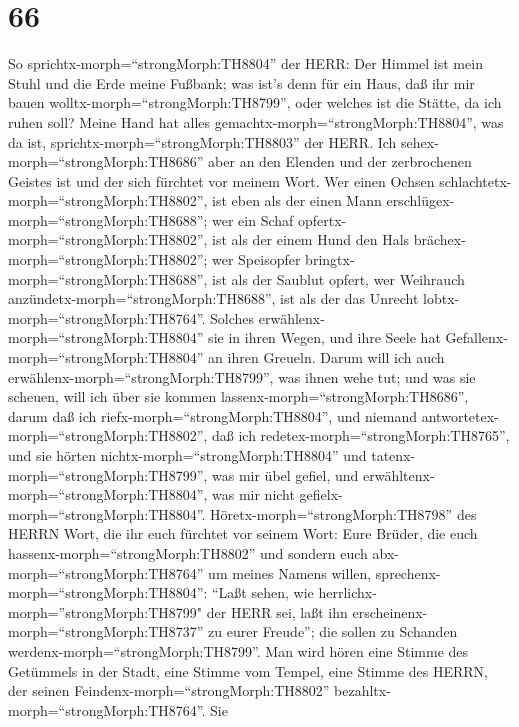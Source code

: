 \hypertarget{section-65}{%
\section{66}\label{section-65}}

 So sprichtx-morph=``strongMorph:TH8804'' der HERR: Der
Himmel ist mein Stuhl und die Erde meine Fußbank; was ist's denn für ein
Haus, daß ihr mir bauen wolltx-morph=``strongMorph:TH8799'', oder
welches ist die Stätte, da ich ruhen soll?  Meine Hand hat
alles gemachtx-morph=``strongMorph:TH8804'', was da ist,
sprichtx-morph=``strongMorph:TH8803'' der HERR. Ich
sehex-morph=``strongMorph:TH8686'' aber an den Elenden und der
zerbrochenen Geistes ist und der sich fürchtet vor meinem Wort.
 Wer einen Ochsen schlachtetx-morph=``strongMorph:TH8802'',
ist eben als der einen Mann erschlügex-morph=``strongMorph:TH8688''; wer
ein Schaf opfertx-morph=``strongMorph:TH8802'', ist als der einem Hund
den Hals brächex-morph=``strongMorph:TH8802''; wer Speisopfer
bringtx-morph=``strongMorph:TH8688'', ist als der Saublut opfert, wer
Weihrauch anzündetx-morph=``strongMorph:TH8688'', ist als der das
Unrecht lobtx-morph=``strongMorph:TH8764''. Solches
erwählenx-morph=``strongMorph:TH8804'' sie in ihren Wegen, und ihre
Seele hat Gefallenx-morph=``strongMorph:TH8804'' an ihren Greueln.
 Darum will ich auch erwählenx-morph=``strongMorph:TH8799'',
was ihnen wehe tut; und was sie scheuen, will ich über sie kommen
lassenx-morph=``strongMorph:TH8686'', darum daß ich
riefx-morph=``strongMorph:TH8804'', und niemand
antwortetex-morph=``strongMorph:TH8802'', daß ich
redetex-morph=``strongMorph:TH8765'', und sie hörten
nichtx-morph=``strongMorph:TH8804'' und
tatenx-morph=``strongMorph:TH8799'', was mir übel gefiel, und
erwähltenx-morph=``strongMorph:TH8804'', was mir nicht
gefielx-morph=``strongMorph:TH8804''. 
Höretx-morph=``strongMorph:TH8798'' des HERRN Wort, die ihr euch
fürchtet vor seinem Wort: Eure Brüder, die euch
hassenx-morph=``strongMorph:TH8802'' und sondern euch
abx-morph=``strongMorph:TH8764'' um meines Namens willen,
sprechenx-morph=``strongMorph:TH8804'': ``Laßt sehen, wie
herrlichx-morph=''strongMorph:TH8799" der HERR sei, laßt ihn
erscheinenx-morph=``strongMorph:TH8737'' zu eurer Freude''; die sollen
zu Schanden werdenx-morph=``strongMorph:TH8799''.  Man wird
hören eine Stimme des Getümmels in der Stadt, eine Stimme vom Tempel,
eine Stimme des HERRN, der seinen Feindenx-morph=``strongMorph:TH8802''
bezahltx-morph=``strongMorph:TH8764''.  Sie
